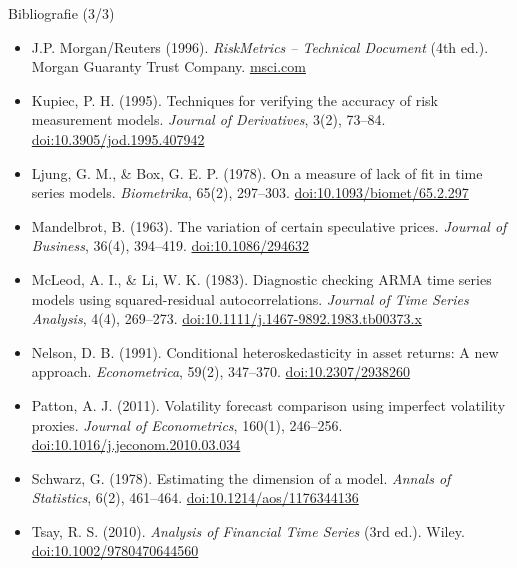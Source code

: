 \begin{frame}{Bibliografie (3/3)}
\itemsize{\scriptsize}
\begin{itemize}
    \item J.P. Morgan/Reuters (1996). \textit{RiskMetrics -- Technical Document} (4th ed.). Morgan Guaranty Trust Company. \href{https://www.msci.com/documents/10199/5915b101-4206-4ba0-aee2-3449d5c7e95a}{msci.com}
    \item Kupiec, P. H. (1995). Techniques for verifying the accuracy of risk measurement models. \textit{Journal of Derivatives}, 3(2), 73--84. \href{https://doi.org/10.3905/jod.1995.407942}{doi:10.3905/jod.1995.407942}
    \item Ljung, G. M., \& Box, G. E. P. (1978). On a measure of lack of fit in time series models. \textit{Biometrika}, 65(2), 297--303. \href{https://doi.org/10.1093/biomet/65.2.297}{doi:10.1093/biomet/65.2.297}
    \item Mandelbrot, B. (1963). The variation of certain speculative prices. \textit{Journal of Business}, 36(4), 394--419. \href{https://doi.org/10.1086/294632}{doi:10.1086/294632}
    \item McLeod, A. I., \& Li, W. K. (1983). Diagnostic checking ARMA time series models using squared-residual autocorrelations. \textit{Journal of Time Series Analysis}, 4(4), 269--273. \href{https://doi.org/10.1111/j.1467-9892.1983.tb00373.x}{doi:10.1111/j.1467-9892.1983.tb00373.x}
    \item Nelson, D. B. (1991). Conditional heteroskedasticity in asset returns: A new approach. \textit{Econometrica}, 59(2), 347--370. \href{https://doi.org/10.2307/2938260}{doi:10.2307/2938260}
    \item Patton, A. J. (2011). Volatility forecast comparison using imperfect volatility proxies. \textit{Journal of Econometrics}, 160(1), 246--256. \href{https://doi.org/10.1016/j.jeconom.2010.03.034}{doi:10.1016/j.jeconom.2010.03.034}
    \item Schwarz, G. (1978). Estimating the dimension of a model. \textit{Annals of Statistics}, 6(2), 461--464. \href{https://doi.org/10.1214/aos/1176344136}{doi:10.1214/aos/1176344136}
    \item Tsay, R. S. (2010). \textit{Analysis of Financial Time Series} (3rd ed.). Wiley. \href{https://doi.org/10.1002/9780470644560}{doi:10.1002/9780470644560}
\end{itemize}
\end{frame}


